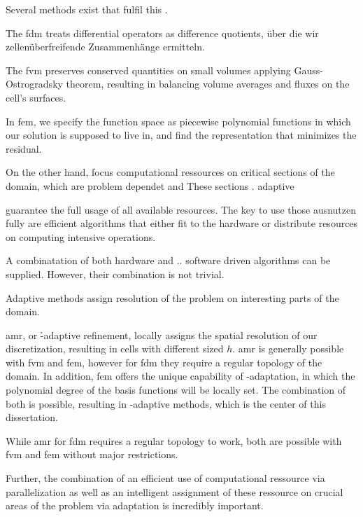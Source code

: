 Several methods exist that fulfil this .

The \gls{fdm} treats differential operators as difference quotients, über die wir zellenüberfreifende Zusammenhänge ermitteln.

The \gls{fvm} preserves conserved quantities on small volumes applying Gauss-Ostrogradsky theorem, resulting in balancing volume averages and fluxes on the cell's surfaces.

In \gls{fem}, we specify the function space as piecewise polynomial functions in which our solution is supposed to live in, and find the representation that minimizes the residual.



On the other hand, focus computational ressources on critical sections of the domain, which are problem dependet and  These sections . adaptive


guarantee the full usage of all available resources. The key to use those ausnutzen fully are efficient algorithms that either fit to the hardware or distribute resources on computing intensive operations.


A combinatation of both hardware and .. software driven algorithms can be supplied. However, their combination is not trivial. 


Adaptive methods assign resolution of the problem on interesting parts of the domain.

\Gls{amr}, or \h-adaptive refinement, locally assigns the spatial resolution of our discretization, resulting in cells with different sized $h$. \gls{amr} is generally possible with \gls{fvm} and \gls{fem}, however for \gls{fdm} they require a regular topology of the domain. In addition, \gls{fem} offers the unique capability of \p-adaptation, in which the polynomial degree of the basis functions will be locally set. The combination of both is possible, resulting in \hp-adaptive methods, which is the center of this dissertation.


While \gls{amr} for \gls{fdm} requires a regular topology to work, both are possible with \gls{fvm} and \gls{fem} without major restrictions.


Further, the combination of an efficient use of computational ressource via parallelization as well as an intelligent assignment of these ressource on crucial areas of the problem via adaptation is incredibly important.

